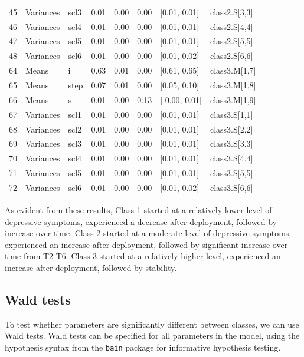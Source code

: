 \documentclass[
  man,floatsintext]{apa6}
\begin{document}
\begin{center}
\begin{ThreePartTable}
\begin{longtable}{llllllll}
45 & Variances & scl3 & 0.01 & 0.00 & 0.00 & {}[0.01, 0.01] & class2.S[3,3]\\
46 & Variances & scl4 & 0.01 & 0.00 & 0.00 & {}[0.01, 0.01] & class2.S[4,4]\\
47 & Variances & scl5 & 0.01 & 0.00 & 0.00 & {}[0.01, 0.01] & class2.S[5,5]\\
48 & Variances & scl6 & 0.01 & 0.00 & 0.00 & {}[0.01, 0.02] & class2.S[6,6]\\
64 & Means & i & 0.63 & 0.01 & 0.00 & {}[0.61, 0.65] & class3.M[1,7]\\
65 & Means & step & 0.07 & 0.01 & 0.00 & {}[0.05, 0.10] & class3.M[1,8]\\
66 & Means & s & 0.01 & 0.00 & 0.13 & {}[-0.00, 0.01] & class3.M[1,9]\\
67 & Variances & scl1 & 0.01 & 0.00 & 0.00 & {}[0.01, 0.01] & class3.S[1,1]\\
68 & Variances & scl2 & 0.01 & 0.00 & 0.00 & {}[0.01, 0.01] & class3.S[2,2]\\
69 & Variances & scl3 & 0.01 & 0.00 & 0.00 & {}[0.01, 0.01] & class3.S[3,3]\\
70 & Variances & scl4 & 0.01 & 0.00 & 0.00 & {}[0.01, 0.01] & class3.S[4,4]\\
71 & Variances & scl5 & 0.01 & 0.00 & 0.00 & {}[0.01, 0.01] & class3.S[5,5]\\
72 & Variances & scl6 & 0.01 & 0.00 & 0.00 & {}[0.01, 0.02] & class3.S[6,6]\\
\bottomrule
\end{longtable}

\end{ThreePartTable}
\end{center}

As evident from these results, Class 1 started at a relatively lower
level of depressive symptoms, experienced a decrease after deployment,
followed by increase over time. Class 2 started at a moderate level of
depressive symptoms, experienced an increase after deployment, followed
by significant increase over time from T2-T6. Class 3 started at a
relatively higher level, experienced an increase after deployment,
followed by stability.

\hypertarget{wald-tests}{%
\subsection{Wald tests}\label{wald-tests}}

To test whether parameters are significantly different between classes,
we can use Wald tests. Wald tests can be specified for all parameters in
the model, using the hypothesis syntax from the \texttt{bain} package for
informative hypothesis testing.
\end{document}
